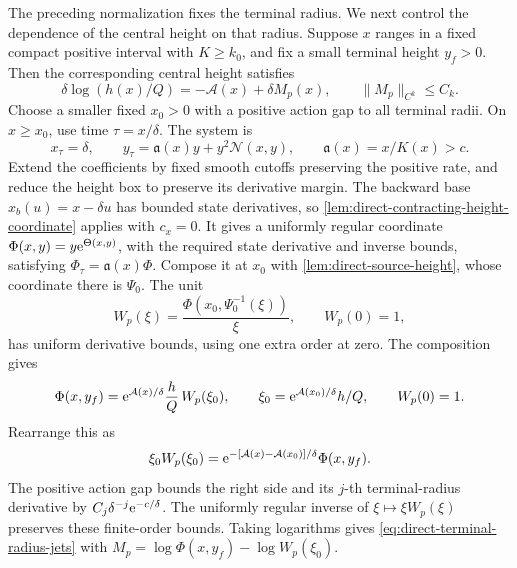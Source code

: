 The preceding normalization fixes the terminal radius. We next control
the dependence of the central height on that radius.
Suppose \(x\) ranges in a fixed compact positive
interval with \(K\ge k_0\), and fix a small terminal height \(y_f>0\).
Then the corresponding central height satisfies
\begin{equation}
\label{eq:direct-terminal-radius-jets}
 \delta\log(h(x)/Q)=-\mathcal A(x)+\delta M_p(x),\qquad
 \|M_p\|_{C^k}\le C_k .
\end{equation}
Choose a smaller fixed \(x_0>0\) with a positive action gap to
all terminal radii. On \(x\ge x_0\), use time \(\tau=x/\delta\).
The system is
\[
 x_\tau=\delta,\qquad
 y_\tau=\mathfrak a(x)y+y^2\mathcal N(x,y),\qquad \mathfrak a(x)=x/K(x)>c.
\]
Extend the coefficients by fixed smooth cutoffs preserving the positive
rate, and reduce the height box to preserve its derivative margin.
The backward base \(x_b(u)=x-\delta u\) has bounded state derivatives,
so \cref{lem:direct-contracting-height-coordinate} applies with
\(c_x=0\). It gives a uniformly regular coordinate
\(\Phi(x,y)=y\mathrm e^{\Theta(x,y)}\), with the required state derivative
and inverse bounds, satisfying \(\Phi_\tau=\mathfrak a(x)\Phi\).
Compose it at \(x_0\) with
\cref{lem:direct-source-height}, whose coordinate there is
\(\Psi_0\). The unit
\[
 W_p(\xi)=\frac{\Phi(x_0,\Psi_0^{-1}(\xi))}{\xi},
 \qquad W_p(0)=1,
\]
has uniform derivative bounds, using one extra order at zero.
The composition gives
\[
 \Phi(x,y_f)=\mathrm e^{\mathcal A(x)/\delta}\frac hQ\,W_p(\xi_0),\qquad
 \xi_0=\mathrm e^{\mathcal A(x_0)/\delta}h/Q,\qquad W_p(0)=1.
\]
Rearrange this as
\[
 \xi_0W_p(\xi_0)=
 \mathrm e^{-[\mathcal A(x)-\mathcal A(x_0)]/\delta}\Phi(x,y_f).
\]
The positive action gap bounds the right side and its \(j\)-th
terminal-radius derivative by \(C_j\delta^{-j}\mathrm e^{-c/\delta}\).
The uniformly regular inverse of \(\xi\mapsto\xi W_p(\xi)\) preserves
these finite-order bounds. Taking logarithms gives
\eqref{eq:direct-terminal-radius-jets} with
\(M_p=\log\Phi(x,y_f)-\log W_p(\xi_0)\).

